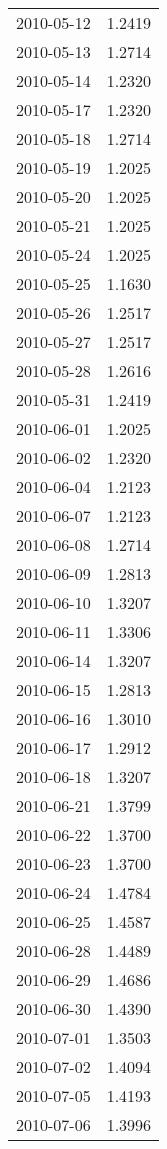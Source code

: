 \begin{tabular}{lr}
2010-05-12 &      1.2419 \\
2010-05-13 &      1.2714 \\
2010-05-14 &      1.2320 \\
2010-05-17 &      1.2320 \\
2010-05-18 &      1.2714 \\
2010-05-19 &      1.2025 \\
2010-05-20 &      1.2025 \\
2010-05-21 &      1.2025 \\
2010-05-24 &      1.2025 \\
2010-05-25 &      1.1630 \\
2010-05-26 &      1.2517 \\
2010-05-27 &      1.2517 \\
2010-05-28 &      1.2616 \\
2010-05-31 &      1.2419 \\
2010-06-01 &      1.2025 \\
2010-06-02 &      1.2320 \\
2010-06-04 &      1.2123 \\
2010-06-07 &      1.2123 \\
2010-06-08 &      1.2714 \\
2010-06-09 &      1.2813 \\
2010-06-10 &      1.3207 \\
2010-06-11 &      1.3306 \\
2010-06-14 &      1.3207 \\
2010-06-15 &      1.2813 \\
2010-06-16 &      1.3010 \\
2010-06-17 &      1.2912 \\
2010-06-18 &      1.3207 \\
2010-06-21 &      1.3799 \\
2010-06-22 &      1.3700 \\
2010-06-23 &      1.3700 \\
2010-06-24 &      1.4784 \\
2010-06-25 &      1.4587 \\
2010-06-28 &      1.4489 \\
2010-06-29 &      1.4686 \\
2010-06-30 &      1.4390 \\
2010-07-01 &      1.3503 \\
2010-07-02 &      1.4094 \\
2010-07-05 &      1.4193 \\
2010-07-06 &      1.3996 \\

\end{tabular}
